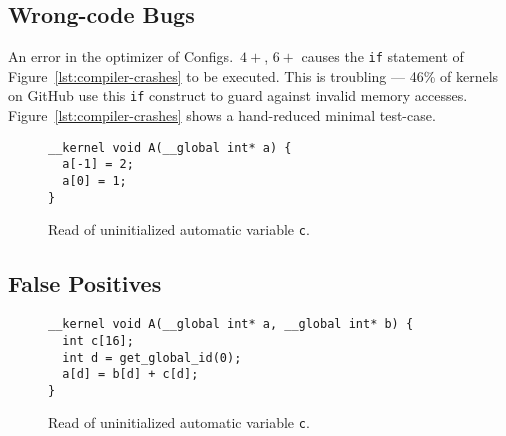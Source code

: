 

\subsection{Wrong-code Bugs}

An error in the optimizer of Configs.\ $4+$, $6+$ causes the \texttt{if} statement of Figure~\ref{lst:compiler-crashes} to be executed.
This is troubling --- 46\% of kernels on GitHub use this \texttt{if} construct to guard against invalid memory accesses. Figure~\ref{lst:compiler-crashes} shows a hand-reduced minimal test-case.




\begin{figure}
\begin{lstlisting}
__kernel void A(__global int* a) {
  a[-1] = 2;
  a[0] = 1;
}
\end{lstlisting}
\caption{Read of uninitialized automatic variable \texttt{c}.}
\label{lst:uninit-read}
\end{figure}


\subsection{False Positives}

\begin{figure}
\begin{lstlisting}
__kernel void A(__global int* a, __global int* b) {
  int c[16];
  int d = get_global_id(0);
  a[d] = b[d] + c[d];
}
\end{lstlisting}
\caption{Read of uninitialized automatic variable \texttt{c}.}
\label{lst:uninit-read}
\end{figure}
